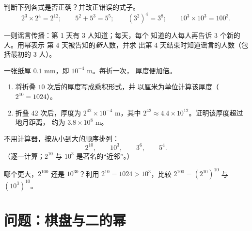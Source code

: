 \begin{exercise}[$\star$]\label{exo:g8:powers:7}
判断下列各式是否正确？并改正错误的式子。
\[
2^3 \times 2^4 = 2^{12}; \qquad
5^2 + 5^3 = 5^5; \qquad
(3^2)^4 = 3^8; \qquad
10^3 \times 10^3 = 100^3 .
\]
\end{exercise}

\begin{exercise}[$\star\star$]\label{exo:g8:powers:8}
一则谣言传播：第 1 天有 3 人知道；每天，每个
知道的人每人再告诉 3 个新的人。用幂表示
第 $4$ 天被告知的\emph{新}人数，并求
出第 4 天结束时知道谣言的人数（包括最初的 3 人）。
\end{exercise}

\begin{exercise}[$\star\star$]\label{exo:g8:powers:9}
一张纸厚 $0.1$ mm，即 $10^{-4}$ m。每折一次，
厚度便加倍。
\begin{enumerate}
  \item 将折叠 $10$ 次后的厚度写成乘积形式，并
        以厘米为单位计算该厚度（$2^{10} = 1024$）。
  \item 折叠 $42$ 次后，厚度为
        $2^{42} \times 10^{-4}$ m，其中 $2^{42} \approx 4.4 \times
        10^{12}$。证明该厚度超过地月距离，
        约为 $3.8 \times 10^8$ m。
\end{enumerate}
\end{exercise}

\begin{exercise}[$\star\star$]\label{exo:g8:powers:10}
不用计算器，按从小到大的顺序排列：
\[
2^{10}, \qquad 10^3, \qquad 3^6, \qquad 5^4 .
\]
（逐一计算；$2^{10}$ 与 $10^3$ 是著名的“近邻”。）
\end{exercise}

\begin{exercise}[$\star\star\star$]\label{exo:g8:powers:11}
哪个更大，$2^{100}$ 还是 $10^{30}$？利用
$2^{10} = 1024 > 10^3$，比较
$2^{100} = \left(2^{10}\right)^{10}$ 与
$\left(10^3\right)^{10}$。
\end{exercise}

\section{问题：棋盘与二的幂}

